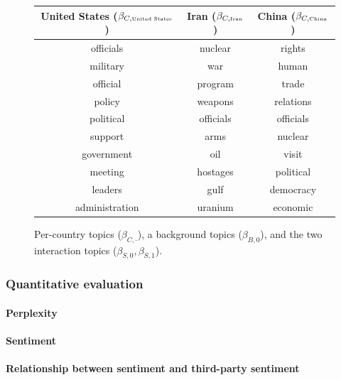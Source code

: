 \begin{figure}
\begin{tabular}{|c|c|c|}
  \textbf{United States ($\beta_{C,\mbox{\tiny United States}}$)} &
  \textbf{Iran ($\beta_{C,\mbox{\tiny Iran}}$)} &
  \textbf{China ($\beta_{C,\mbox{\tiny China}}$)} \\
  \hline
  officials & nuclear & rights \\
  military & war & human \\
  official & program & trade \\
  policy & weapons & relations \\
  political & officials & officials \\
  support & arms & nuclear \\
  government & oil & visit \\
  meeting & hostages & political \\
  leaders & gulf & democracy \\
  administration & uranium & economic \\
  \hline
\end{tabular}
\caption{Per-country topics ($\beta_{C,\cdot}$), a background topics ($\beta_{B,0}$), and the two interaction topics ($\beta_{S,0}, \beta_{S,1}$).}
\label{fig:fr_unsupervised_topics}
\end{figure}

\subsubsection*{Quantitative evaluation}
\paragraph{Perplexity}
\paragraph{Sentiment}

\paragraph{Relationship between sentiment and third-party sentiment}


